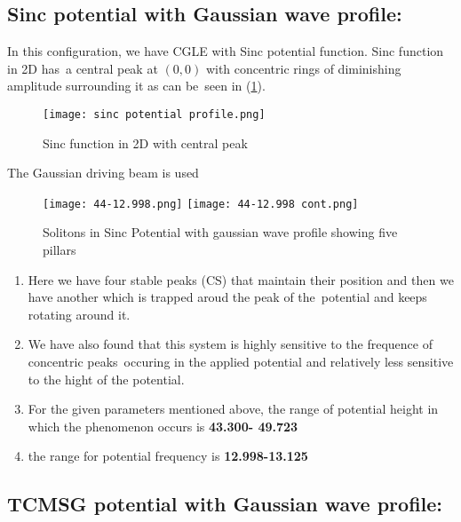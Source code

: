 \subsection{Sinc potential with Gaussian wave profile:}
In this configuration, we have CGLE with Sinc potential function. Sinc function in 2D has\
a central peak at $(0,0)$ with concentric rings of diminishing amplitude surrounding it as can be\
seen in (\ref{fig:2D_Sinc_potential}).  

\begin{figure}[h!]
    \centering
    \texttt{[image: sinc potential profile.png]}
    \caption{Sinc function in 2D with central peak}
        \label{fig:2D_Sinc_potential}
\end{figure}

The Gaussian driving beam is used 

\begin{figure}[h!]
    \texttt{[image: 44-12.998.png]}
    \texttt{[image: 44-12.998 cont.png]}
    \caption{Solitons in Sinc Potential with gaussian wave profile showing five pillars}
    \label{fig:Sinc_with_gaussian_profile}
\end{figure}

\begin{enumerate}
    \item Here we have four stable peaks (CS) that maintain their position and then we have another which is trapped aroud the peak of the\ 
    potential and keeps rotating around it. 
    \item  We have also found that this system is highly sensitive to the frequence of concentric peaks\ 
    occuring in the applied potential and relatively less sensitive to the hight of the potential.
    \item For the given parameters mentioned above, the range of potential height in which the phenomenon occurs is {\bf43.300- 49.723}
    \item the range for potential frequency is {\bf 12.998-13.125}
\end{enumerate}
    

\subsection{TCMSG potential with Gaussian wave profile:}

